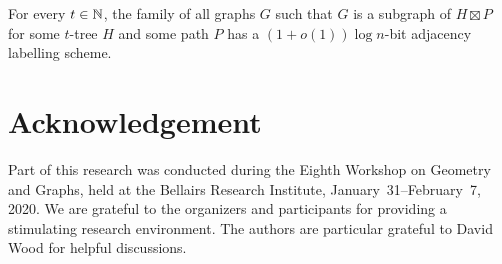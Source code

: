 \documentclass[kpfonts]{patmorin}
\newcommand{\snote}[1]{\fcolorbox{red}{yellow}{#1}}
\begin{document}
\begin{thm}
  For every $t\in\mathbb{N}$, the family of all graphs $G$ such that $G$ is a subgraph of $H\boxtimes P$ for some $t$-tree $H$ and some path $P$ has a $(1+o(1))\log n$-bit adjacency labelling scheme.
\end{thm}
% 
% 
% 
% 
% 

% 
% 

\section*{Acknowledgement}

Part of this research was conducted during the Eighth Workshop on Geometry and Graphs, held at the Bellairs Research Institute, January~31--February~7, 2020.  We are grateful to the organizers and participants for providing a stimulating research environment.  The authors are particular grateful to David Wood for helpful discussions.
\end{document}

